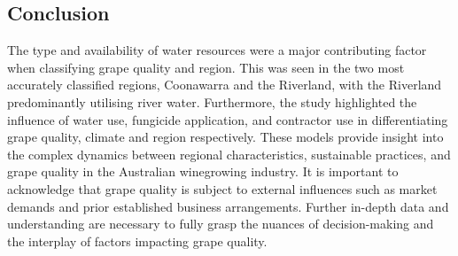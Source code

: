 \documentclass[review,12pt,authoryear]{elsarticle}
\begin{document}
\begin{linenumbers}
\section{Conclusion}

The type and availability of water resources were a major contributing factor when classifying grape quality and region. This was seen in the two most accurately classified regions, Coonawarra and the Riverland, with the Riverland predominantly utilising river water. Furthermore, the study highlighted the influence of water use, fungicide application, and contractor use in differentiating grape quality, climate and region respectively. These models provide insight into the complex dynamics between regional characteristics, sustainable practices, and grape quality in the Australian winegrowing industry. It is important to acknowledge that grape quality is subject to external influences such as market demands and prior established business arrangements. Further in-depth data and understanding are necessary to fully grasp the nuances of decision-making and the interplay of factors impacting grape quality.




 \appendix

\end{linenumbers}
  
\end{document}

